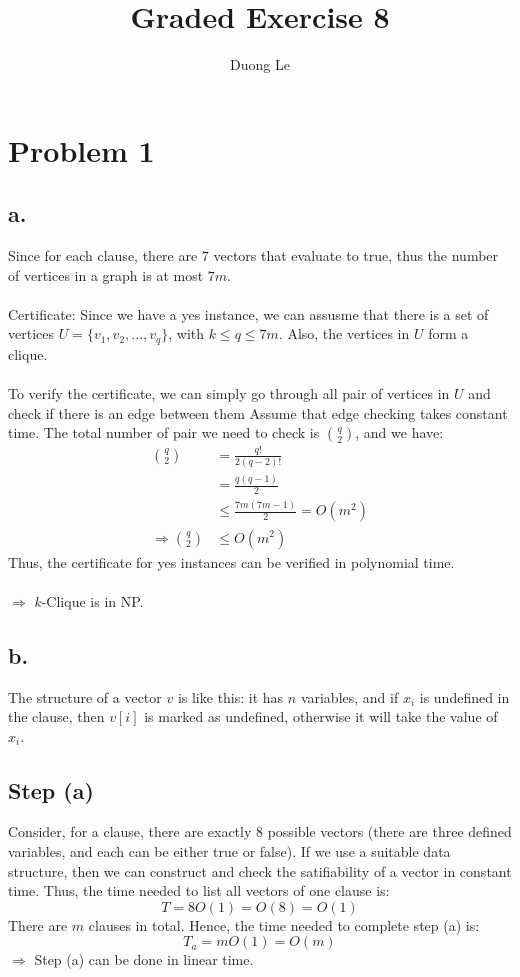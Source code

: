 \documentclass{article}
\title{Graded Exercise 8}
\author{Duong Le}
\date{}
\begin{document}
\maketitle

\section*{Problem 1}
\subsection*{a.}
Since for each clause, there are 7 vectors that evaluate to true, thus the number of vertices in a graph is at most $7m$. \\\\
Certificate: Since we have a yes instance, we can assusme that there is a set of vertices $U = \{v_1, v_2, ..., v_q\}$, with $k \leq q \leq 7m$. Also, the vertices in $U$ form a clique. \\\\
To verify the certificate, we can simply go through all pair of vertices in $U$ and check if there is an edge between them Assume that edge checking takes constant time. The total number of pair we need to check is ${q}\choose{2}$, and we have:
\[
\begin{aligned}
{q} \choose {2} &= \frac{q!}{2(q-2)!} \\ 
                        &= \frac{q(q-1)}{2} \\
                        &\leq \frac{7m(7m-1)}{2} = O(m^2) \\
\Longrightarrow {{q}\choose{2}} &\leq O(m^2)
\end{aligned}
\]
Thus, the certificate for yes instances can be verified in polynomial time. \\\\
$\Longrightarrow$ $k$-Clique is in NP.

\pagebreak
\subsection*{b.}
The structure of a vector $v$ is like this: it has $n$ variables, and if $x_i$ is undefined in the clause, then $v[i]$ is marked as undefined, otherwise it will take the value of $x_i$.
\subsection*{Step (a)}
Consider, for a clause, there are exactly 8 possible vectors (there are three defined variables, and each can be either true or false). If we use a suitable data structure, then we can construct and check the satifiability of a vector in constant time. Thus, the time needed to list all vectors of one clause is:
\[
T = 8O(1) = O(8) = O(1)
\]
There are $m$ clauses in total. Hence, the time needed to complete step (a) is:
\[
T_a = mO(1) = O(m)
\]
$\Rightarrow$ Step (a) can be done in linear time. \\\\
\end{document}

